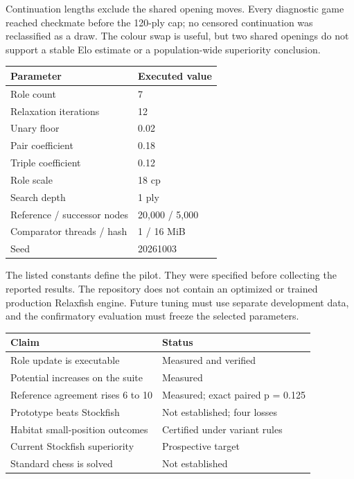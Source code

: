 \documentclass[10pt]{article}
\begin{document}
Continuation lengths exclude the shared opening moves. Every diagnostic game reached checkmate before the 120-ply cap; no censored continuation was reclassified as a draw. The colour swap is useful, but two shared openings do not support a stable Elo estimate or a population-wide superiority conclusion.

\begin{center}\small
\begin{tabular}{p{.43\linewidth}p{.48\linewidth}}\toprule
Parameter & Executed value\\\midrule
Role count & 7\\
Relaxation iterations & 12\\
Unary floor & 0.02\\
Pair coefficient & 0.18\\
Triple coefficient & 0.12\\
Role scale & 18 cp\\
Search depth & 1 ply\\
Reference / successor nodes & 20,000 / 5,000\\
Comparator threads / hash & 1 / 16 MiB\\
Seed & 20261003\\
\bottomrule\end{tabular}\end{center}


The listed constants define the pilot. They were specified before collecting the reported results. The repository does not contain an optimized or trained production Relaxfish engine. Future tuning must use separate development data, and the confirmatory evaluation must freeze the selected parameters.

\begin{center}\small
\begin{tabular}{p{.43\linewidth}p{.48\linewidth}}\toprule
Claim & Status\\\midrule
Role update is executable & Measured and verified\\
Potential increases on the suite & Measured\\
Reference agreement rises 6 to 10 & Measured; exact paired p = 0.125\\
Prototype beats Stockfish & Not established; four losses\\
Habitat small-position outcomes & Certified under variant rules\\
Current Stockfish superiority & Prospective target\\
Standard chess is solved & Not established\\
\bottomrule\end{tabular}\end{center}
\end{document}

